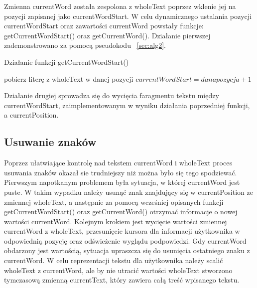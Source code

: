 \documentclass[twoside,a4paper]{book}
\begin{document}
Zmienna currentWord została zespolona z wholeText poprzez wklenie jej na pozycji zapisanej jako currentWordStart. 
W celu dynamicznego ustalania pozycji currentWordStart oraz zawartości currentWord powstały funkcje: getCurrentWordStart() oraz getCurrentWord(). Działanie pierwszej zademonstrowano za pomocą pseudokodu ~\ref{sec:alg2}.
\begin{algorithm}
\caption{Działanie funkcji getCurrentWordStart()}
\label{sec:alg2}
\begin{algorithmic}
\STATE pobierz literę z wholeText w danej pozycji
\STATE $currentWordStart = dana pozycja + 1$
\ENDIF
\ENDFOR
\ENDIF
\end{algorithmic}
\end{algorithm}
Działanie drugiej sprowadza się do wycięcia faragmentu tekstu między currentWordStart, zaimplementowanym w wyniku działania poprzedniej funkcji, a currentPosition.
\subsection{Usuwanie znaków} \label{sec:backspc}
Poprzez ułatwiające kontrolę nad tekstem currentWord i wholeText proces usuwania znaków okazał sie trudniejszy niż można było się tego spodziewać. Pierwszym napotkanym problemem była sytuacja, w której currentWord jest puste. W takim wypadku należy usunąć znak znajdujący się w currentPosition ze zmiennej wholeText, a następnie za pomocą wcześniej opisanych funkcji getCurrentWordStart() oraz getCurrentWord() otrzymać informacje o nowej wartości currentWord. Kolejnym krokiem jest wycięcie wartości zmiennej currentWord z wholeText, przesunięcie kursora dla informacji użytkownika w odpowiednią pozycję oraz odświeżenie wyglądu podpowiedzi.
Gdy currentWord obdarzony jest wartością, sytuacja upraszcza się do usunięcia ostatniego znaku z currentWord. W celu reprezentacji tekstu dla użytkownika należy scalić wholeText z currentWord, ale by nie utracić wartości wholeText stworzono tymczasową zmienną currentText, który zawiera całą treść wpisanego tekstu.
\end{document}
